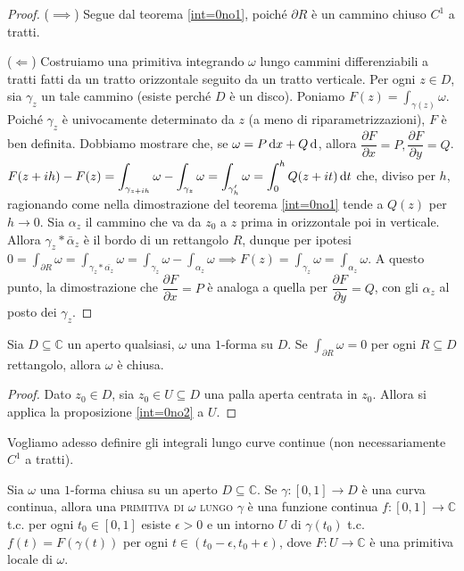 \begin{proof}
  ($\implies$) Segue dal teorema \ref{int=0no1}, poiché $\partial R$ è un cammino chiuso $C^1$ a tratti.

  ($\Leftarrow$) Costruiamo una primitiva integrando $\omega$ lungo cammini differenziabili a tratti fatti da un tratto orizzontale seguito da un tratto verticale. Per ogni $z \in D$, sia $\gamma_z$ un tale cammino (esiste perché $D$ è un disco). Poniamo $\displaystyle F(z)=\int_{\gamma(z)} \omega$. Poiché $\gamma_z$ è univocamente determinato da $z$ (a meno di riparametrizzazioni), $F$ è ben definita. Dobbiamo mostrare che, se $\omega=P\mathop{}\!\mathrm{d} x+Q\mathop{}\!\mathrm{d} $, allora $\dfrac{\partial F}{\partial x}=P, \dfrac{\partial F}{\partial y}=Q$.
  $\displaystyle F(z+ih)-F(z)=\int_{\gamma_{z+ih}} \omega-\int_{\gamma_z} \omega=\int_{\gamma_h'} \omega=\int_0^h Q(z+it) \mathop{}\!\mathrm{d} t$ che, diviso per $h$, ragionando come nella dimostrazione del teorema \ref{int=0no1} tende a $Q(z)$ per $h \longrightarrow 0$. Sia $\alpha_z$ il cammino che va da $z_0$ a $z$ prima in orizzontale poi in verticale.
  Allora $\gamma_z * \bar{\alpha}_z$ è il bordo di un rettangolo $R$, dunque per ipotesi $\displaystyle 0=\int_{\partial R} \omega=\int_{\gamma_z*\bar{\alpha_z}} \omega=\int_{\gamma_z}\omega-\int_{\alpha_z} \omega \implies F(z)=\int_{\gamma_z}\omega=\int_{\alpha_z}\omega$.
  A questo punto, la dimostrazione che $\dfrac{\partial F}{\partial x}=P$ è analoga a quella per $\dfrac{\partial F}{\partial y}=Q$, con gli $\alpha_z$ al posto dei $\gamma_z$.
\end{proof}

\begin{cor}
  Sia $D \subseteq \mathbb{C}$ un aperto qualsiasi, $\omega$ una $1$-forma su $D$. Se $\displaystyle \int_{\partial R} \omega=0$ per ogni $R \subseteq D$ rettangolo, allora $\omega$ è chiusa.
\end{cor}

\begin{proof}
  Dato $z_0 \in D$, sia $z_0 \in U \subseteq D$ una palla aperta centrata in $z_0$. Allora si applica la proposizione \ref{int=0no2} a $U$.
\end{proof}

Vogliamo adesso definire gli integrali lungo curve continue (non necessariamente $C^1$ a tratti).

\begin{defn} \label{prim_gamma}
  Sia $\omega$ una $1$-forma chiusa su un aperto $D \subseteq \mathbb{C}$. Se $\gamma:[0, 1] \longrightarrow D$ è una curva continua, allora una \textsc{primitiva di $\omega$ lungo $\gamma$} è una funzione continua $f:[0, 1] \longrightarrow \mathbb{C}$ t.c. per ogni $t_0 \in [0, 1]$ esiste $\epsilon>0$ e un intorno $U$ di $\gamma(t_0)$ t.c.
  $f(t)=F(\gamma(t))$ per ogni $t \in (t_0-\epsilon, t_0+\epsilon)$, dove $F:U \longrightarrow \mathbb{C}$ è una primitiva locale di $\omega$.
\end{defn}

